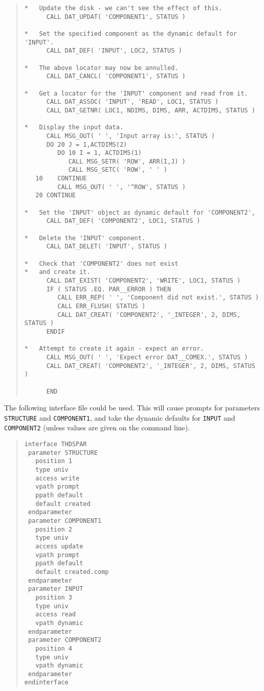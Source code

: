 \documentclass[twoside,11pt]{article}
\renewcommand{\_}{\texttt{\symbol{95}}}
\begin{document}
\begin{quote}
\begin{verbatim}
*   Update the disk - we can't see the effect of this.
      CALL DAT_UPDAT( 'COMPONENT1', STATUS )

*   Set the specified component as the dynamic default for 'INPUT'.
      CALL DAT_DEF( 'INPUT', LOC2, STATUS )      

*   The above locator may now be annulled.
      CALL DAT_CANCL( 'COMPONENT1', STATUS )

*   Get a locator for the 'INPUT' component and read from it.
      CALL DAT_ASSOC( 'INPUT', 'READ', LOC1, STATUS )
      CALL DAT_GETNR( LOC1, NDIMS, DIMS, ARR, ACTDIMS, STATUS )

*   Display the input data.
      CALL MSG_OUT( ' ', 'Input array is:', STATUS )
      DO 20 J = 1,ACTDIMS(2)
         DO 10 I = 1, ACTDIMS(1)
            CALL MSG_SETR( 'ROW', ARR(I,J) )
            CALL MSG_SETC( 'ROW', ' ' )
   10    CONTINUE
         CALL MSG_OUT( ' ', '^ROW', STATUS )     
   20 CONTINUE

*   Set the 'INPUT' object as dynamic default for 'COMPONENT2',
      CALL DAT_DEF( 'COMPONENT2', LOC1, STATUS )

*   Delete the 'INPUT' component.
      CALL DAT_DELET( 'INPUT', STATUS )

*   Check that 'COMPONENT2' does not exist
*   and create it.
      CALL DAT_EXIST( 'COMPONENT2', 'WRITE', LOC1, STATUS )
      IF ( STATUS .EQ. PAR__ERROR ) THEN
         CALL ERR_REP( ' ', 'Component did not exist.', STATUS )
         CALL ERR_FLUSH( STATUS )
         CALL DAT_CREAT( 'COMPONENT2', '_INTEGER', 2, DIMS, STATUS )
      ENDIF

*   Attempt to create it again - expect an error.
      CALL MSG_OUT( ' ', 'Expect error DAT__COMEX.', STATUS )
      CALL DAT_CREAT( 'COMPONENT2', '_INTEGER', 2, DIMS, STATUS )

      END
\end{verbatim} \end{quote}

The following interface file could be used. This will cause prompts for 
parameters \texttt{STRUCTURE} and \texttt{COMPONENT1}, and take the dynamic
defaults for \texttt{INPUT} and \texttt{COMPONENT2} (unless values are given
on the command line).
\begin{quote} \begin{verbatim}
interface THDSPAR
 parameter STRUCTURE
   position 1
   type univ
   access write
   vpath prompt
   ppath default
   default created
 endparameter
 parameter COMPONENT1
   position 2
   type univ
   access update
   vpath prompt
   ppath default
   default created.comp
 endparameter
 parameter INPUT
   position 3
   type univ
   access read
   vpath dynamic
 endparameter
 parameter COMPONENT2
   position 4
   type univ
   vpath dynamic
 endparameter
endinterface

\end{verbatim} \end{quote}
\end{document}
